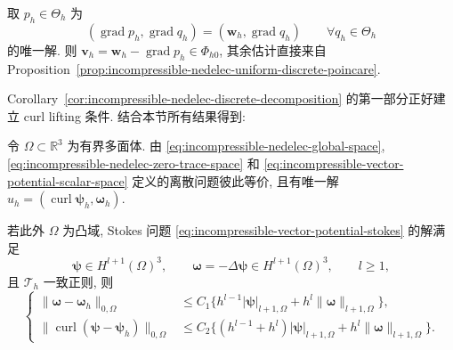 \begin{Proof}
取 $p_h\in\Theta_h$ 为
\[
(\operatorname{grad}p_h,\operatorname{grad}q_h)
=(\mathbf w_h,\operatorname{grad}q_h)
\qquad\forall q_h\in\Theta_h
\]
的唯一解. 则
$\mathbf v_h=\mathbf w_h-\operatorname{grad}p_h\in\Phi_{h0}$,
其余估计直接来自 Proposition~\ref{prop:incompressible-nedelec-uniform-discrete-poincare}.
\end{Proof}

Corollary~\ref{cor:incompressible-nedelec-discrete-decomposition}
的第一部分正好建立 curl lifting 条件.
结合本节所有结果得到:

\begin{Theorem}\label{thm:incompressible-vector-potential-final-error}
令 $\Omega\subset\mathbb R^3$ 为有界多面体.
由 \eqref{eq:incompressible-nedelec-global-space},
\eqref{eq:incompressible-nedelec-zero-trace-space} 和
\eqref{eq:incompressible-vector-potential-scalar-space}
定义的离散问题彼此等价, 且有唯一解
$u_h=(\operatorname{curl}\boldsymbol\psi_h,
\boldsymbol\omega_h)$.

若此外 $\Omega$ 为凸域, Stokes 问题
\eqref{eq:incompressible-vector-potential-stokes} 的解满足
\[
\boldsymbol\psi\in H^{l+1}(\Omega)^3,
\qquad
\boldsymbol\omega=-\Delta\boldsymbol\psi
\in H^{l+1}(\Omega)^3,
\qquad l\geq1,
\]
且 $\mathcal T_h$ 一致正则, 则
\begin{equation}\label{eq:incompressible-vector-potential-final-error}
\left\{
\begin{aligned}
\|\boldsymbol\omega-\boldsymbol\omega_h\|_{0,\Omega}
&\leq C_1\{h^{l-1}|\boldsymbol\psi|_{l+1,\Omega}
+h^l\|\boldsymbol\omega\|_{l+1,\Omega}\},\\
\|\operatorname{curl}(\boldsymbol\psi-\boldsymbol\psi_h)\|_{0,\Omega}
&\leq C_2\{(h^{l-1}+h^l)|\boldsymbol\psi|_{l+1,\Omega}
+h^l\|\boldsymbol\omega\|_{l+1,\Omega}\}.
\end{aligned}
\right.
\end{equation}
\end{Theorem}

